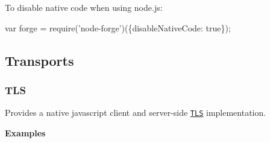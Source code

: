 To disable native code when using node.\+js\+:


\begin{DoxyCode}
var forge = require('node-forge')(\{disableNativeCode: true\});
\end{DoxyCode}
 

 \subsection*{Transports}

\label{_tls}%
 \subsubsection*{T\+LS}

Provides a native javascript client and server-\/side \href{http://en.wikipedia.org/wiki/Transport_Layer_Security}{\tt T\+LS} implementation.

{\bfseries Examples}


